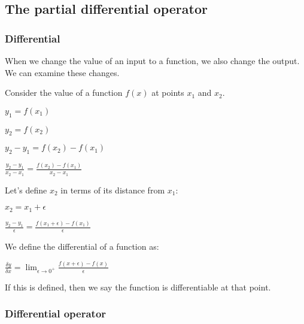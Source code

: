 
\subsection{The partial differential operator}

\subsubsection{Differential}

When we change the value of an input to a function, we also change the output. We can examine these changes.

Consider the value of a function \(f(x)\) at points \(x_1\) and \(x_2\).

\(y_1=f(x_1)\)

\(y_2=f(x_2)\)

\(y_2-y_1=f(x_2)-f(x_1)\)

\(\frac{y_2-y_1}{x_2-x_1}=\frac{f(x_2)-f(x_1)}{x_2-x_1}\)

Let's define \(x_2\) in terms of its distance from \(x_1\):

\(x_2=x_1+\epsilon\)

\(\frac{y_2-y_1}{\epsilon }=\frac{f(x_1+\epsilon )-f(x_1)}{\epsilon }\)

We define the differential of a function as:

\(\frac{\delta y}{\delta x}=\lim_{\epsilon \rightarrow 0^+}\frac{f(x+\epsilon )-f(x)}{\epsilon }\)

If this is defined, then we say the function is differentiable at that point.

\subsubsection{Differential operator}

